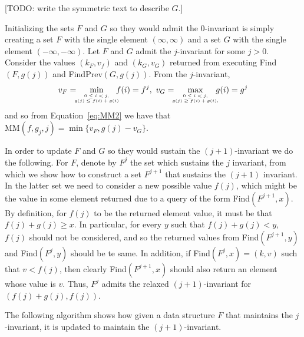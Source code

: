 [TODO: write the symmetric text to describe $G$.]

Initializing the sets $F$ and $G$ so they would admit the $0$-invariant is simply creating a set $F$ with the single element $(\infty, \infty)$ and a set $G$ with the single element $(-\infty, -\infty)$.
Let $F$ and $G$ admit the $j$-invariant for some $j > 0$. 
Consider the values $(k_F, v_f)$ and $(k_G, v_G)$ returned from executing Find$(F, g(j))$ and FindPrev$(G, g(j))$. From the $j$-invariant,
$$
v_F = \hspace{-1em}\min\limits_{{\tiny \begin{array}{c}
		0 \leq i < j, \\
		g(j) \leq f(i) + g(i)
		\end{array}}} \hspace{-1em} f(i) = f^j, \ 
v_G = \hspace{-1em}\max\limits_{{\tiny \begin{array}{c}
		0 \leq i < j, \\
		g(j) \geq f(i) + g(i),
		\end{array}}} \hspace{-1em} g(i) = g^j
$$ 
and so from Equation~\ref{eq:MM2} we have that $\text{MM}(f, g_j, j) = \min\{v_F, g(j) - v_G\}$.



In order to update $F$ and $G$ so they would sustain the $(j+1)$-invariant we do the following. For $F$, denote by $F^j$ the set which sustains the $j$ invariant, from which we show how to construct a set $F^{j+1}$ that sustains the $(j+1)$ invariant. In the latter set we need to consider a new possible value $f(j)$, which might be the value in some element returned due to a query of the form Find$(F^{j+1}, x)$. By definition, for $f(j)$ to be the returned element value, it must be that $f(j) + g(j) \geq x$. In particular, for every $y$ such that $f(j) + g(j) < y$, $f(j)$ should not be considered, and so the returned values from Find$(F^{j+1}, y)$ and Find$(F^{j}, y)$ should be te same. In addition, if Find$(F^{j}, x) = (k, v)$ such that $v < f(j)$, then clearly Find$(F^{j+1}, x)$ should also return an element whose value is $v$. Thus, $F^j$ admits the relaxed $(j+1)$-invariant for $(f(j) + g(j), f(j))$.

The following algorithm shows how given a data structure $F$ that maintains the $j$-invariant, it is updated to maintain the $(j+1)$-invariant.

